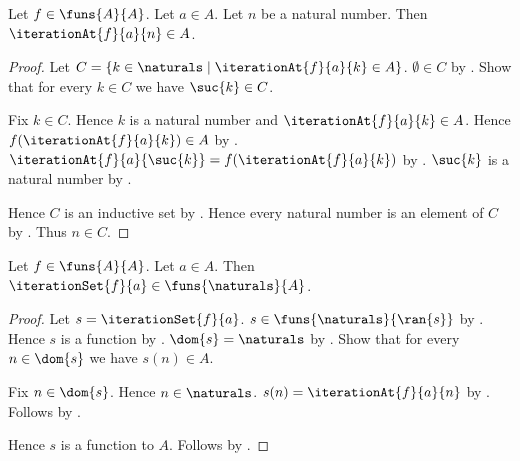 \begin{theorem}\label{iteration_at_closed}
    Let $f\in\funs{A}{A}$.
    Let $a\in A$.
    Let $n$ be a natural number.
    Then $\iterationAt{f}{a}{n}\in A$.
\end{theorem}
\begin{proof}
    Let $C=\{k\in\naturals\mid \iterationAt{f}{a}{k}\in A\}$.
    $\emptyset\in C$
        by .
    Show that for every $k\in C$ we have $\suc{k}\in C$.
    \begin{subproof}
        Fix $k\in C$.
        Hence $k$ is a natural number and
            $\iterationAt{f}{a}{k}\in A$.
        Hence $f(\iterationAt{f}{a}{k})\in A$
            by .
        $\iterationAt{f}{a}{\suc{k}}
            =f(\iterationAt{f}{a}{k})$
            by .
        $\suc{k}$ is a natural number by .
    \end{subproof}
    Hence $C$ is an inductive set by .
    Hence every natural number is an element of $C$
        by .
    Thus $n\in C$.
\end{proof}

\begin{theorem}\label{iteration_set_type}
    Let $f\in\funs{A}{A}$.
    Let $a\in A$.
    Then $\iterationSet{f}{a}\in\funs{\naturals}{A}$.
\end{theorem}
\begin{proof}
    Let $s=\iterationSet{f}{a}$.
    $s\in\funs{\naturals}{\ran{s}}$
        by .
    Hence $s$ is a function by .
    $\dom{s}=\naturals$ by .
    Show that for every $n\in\dom{s}$ we have $s(n)\in A$.
    \begin{subproof}
        Fix $n\in\dom{s}$.
        Hence $n\in\naturals$.
        $s(n)=\iterationAt{f}{a}{n}$
            by .
        Follows by .
    \end{subproof}
    Hence $s$ is a function to $A$.
    Follows by .
\end{proof}
